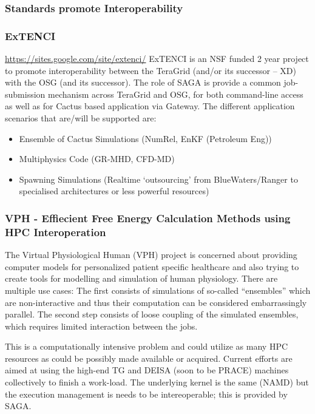 \documentclass[12pt]{article}
\begin{document}
 \subsubsection{Standards promote Interoperability}

 \subsubsection*{ExTENCI}
 \url{https://sites.google.com/site/extenci/} ExTENCI is an NSF funded
 2 year project to promote interoperability between the TeraGrid
 (and/or its successor -- XD) with the OSG (and its successor).
 The role of SAGA is provide a common job-submission mechanism
 across TeraGrid and OSG, for both command-line access as well
 as for Cactus based application via Gateway.
 The different application scenarios that are/will be supported are:
 \begin{itemize}
 \item Ensemble of Cactus Simulations (NumRel, EnKF (Petroleum Eng))
 \item Multiphysics Code (GR-MHD, CFD-MD)
 \item Spawning Simulations (Realtime ‘outsourcing’ from
   BlueWaters/Ranger to specialised architectures or less powerful
   resources)
 \end{itemize}


\subsubsection*{VPH - Effiecient Free Energy Calculation Methods using
  HPC Interoperation}

The Virtual Physiological Human (VPH) project is concerned about
providing computer models for personalized patient specific healthcare
and also trying to create tools for modelling and simulation of human
physiology. There are multiple use cases: The first consists of
simulations of so-called “ensembles” which are non-interactive and
thus their computation can be considered embarrassingly parallel. The
second step consists of loose coupling of the simulated ensembles,
which requires limited interaction between the jobs.

This is a computationally intensive problem and could utilize as many
HPC resources as could be possibly made available or acquired. Current
efforts are aimed at using the high-end TG and DEISA (soon to be
PRACE) machines collectively to finish a work-load. The underlying
kernel is the same (NAMD) but the execution management is needs
to be intereoperable; this is provided by SAGA.
\end{document}
